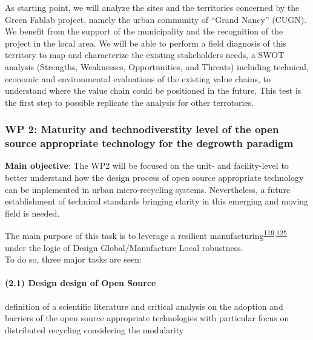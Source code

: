 \documentclass[
  12pt,
  a4paperpaper,
  onecolumn]{article}
\let\oldparagraph\paragraph
\renewcommand{\paragraph}[1]{\oldparagraph{#1}\mbox{}}
\let\paragraph\oldparagraph
\begin{document}
As starting point, we will analyze the sites and the territories
concerned by the Green Fablab project, namely the urban community of
``Grand Nancy'' (CUGN). We benefit from the support of the municipality
and the recognition of the project in the local area. We will be able to
perform a field diagnosis of this territory to map and characterize the
existing stakeholders needs, a SWOT analysis (Strengths, Weaknesses,
Opportunities, and Threats) including technical, economic and
environmental evaluations of the existing value chains, to understand
where the value chain could be positioned in the future. This test is
the first step to possible replicate the analysis for other terrotories.

\small

\normalsize

\hypertarget{wp-2-maturity-and-technodiverstity-level-of-the-open-source-appropriate-technology-for-the-degrowth-paradigm}{%
\subsubsection{WP 2: Maturity and technodiverstity level of the open
source appropriate technology for the degrowth
paradigm}\label{wp-2-maturity-and-technodiverstity-level-of-the-open-source-appropriate-technology-for-the-degrowth-paradigm}}

\textbf{Main objective}: The WP2 will be focused on the unit- and
facility-level to better understand how the design process of open
source appropriate technology can be implemented in urban
micro-recycling systems. Nevertheless, a future establishment of
technical standards bringing clarity in this emerging and moving field
is needed.

The main purpose of this task is to leverage a resilient
manufacturing\textsuperscript{\protect\hyperlink{ref-xu2021e}{119},\protect\hyperlink{ref-zhang2011}{125}}
under the logic of Design Global/Manufacture Local robustness.\\
To do so, three major tasks are seen:

\hypertarget{design-design-of-open-source}{%
\paragraph{(2.1) Design design of Open
Source}\label{design-design-of-open-source}}

definition of a scientific literature and critical analysis on the
adoption and barriers of the open source appropriate technologies with
particular focus on distributed recycling considering the modularity
\end{document}
